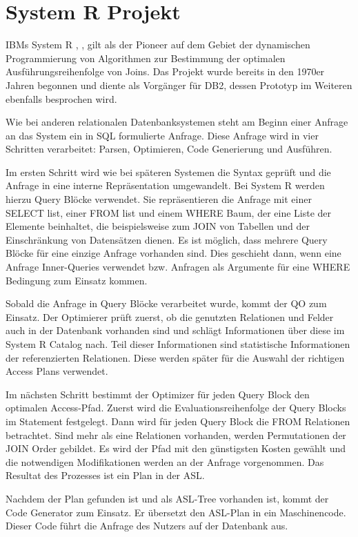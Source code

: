 \section{System R Projekt}

IBMs System R \cite{selinger1979access}, \cite{wade2012ibm}, \cite{chamberlin1981history} gilt als der Pioneer auf dem Gebiet der dynamischen Programmierung von Algorithmen zur Bestimmung der optimalen Ausführungsreihenfolge von Joins. Das Projekt wurde bereits in den 1970er Jahren begonnen und diente als Vorgänger für DB2, dessen Prototyp im Weiteren ebenfalls besprochen wird.

Wie bei anderen relationalen Datenbanksystemen steht am Beginn einer Anfrage an das System ein in \ac{SQL} formulierte Anfrage. Diese Anfrage wird in vier Schritten verarbeitet: Parsen,  Optimieren, Code Generierung und Ausführen.

Im ersten Schritt wird wie bei späteren Systemen die Syntax geprüft und die Anfrage in eine interne Repräsentation umgewandelt. Bei System R werden hierzu Query Blöcke verwendet. Sie repräsentieren die Anfrage mit einer SELECT list, einer FROM list und einem WHERE Baum, der eine Liste der Elemente beinhaltet, die beispielsweise zum JOIN von Tabellen und der Einschränkung von Datensätzen dienen. Es ist möglich, dass mehrere Query Blöcke für eine einzige Anfrage vorhanden sind. Dies geschieht dann, wenn eine Anfrage Inner-Queries verwendet bzw. Anfragen als Argumente für eine WHERE Bedingung zum Einsatz kommen.


Sobald die Anfrage in Query Blöcke verarbeitet wurde, kommt der \ac{QO} zum Einsatz. Der Optimierer prüft zuerst, ob die genutzten Relationen und Felder auch in der Datenbank vorhanden sind und schlägt Informationen über diese im System R Catalog nach. Teil dieser Informationen sind statistische Informationen der referenzierten Relationen. Diese werden später für die Auswahl der richtigen Access Plans verwendet.

Im nächsten Schritt bestimmt der Optimizer für jeden Query Block den optimalen Access-Pfad. Zuerst wird die Evaluationsreihenfolge der Query Blocks im Statement festgelegt. Dann wird für jeden Query Block die FROM Relationen betrachtet. Sind mehr als eine Relationen vorhanden, werden Permutationen der JOIN Order gebildet. Es wird der Pfad mit den günstigsten Kosten gewählt und die notwendigen Modifikationen werden an der Anfrage vorgenommen. Das Resultat des Prozesses ist ein Plan in der \ac{ASL}.

Nachdem der Plan gefunden ist und als \ac{ASL}-Tree vorhanden ist, kommt der Code Generator zum Einsatz. Er übersetzt den \ac{ASL}-Plan in ein Maschinencode. Dieser Code führt die Anfrage des Nutzers auf der Datenbank aus. 

